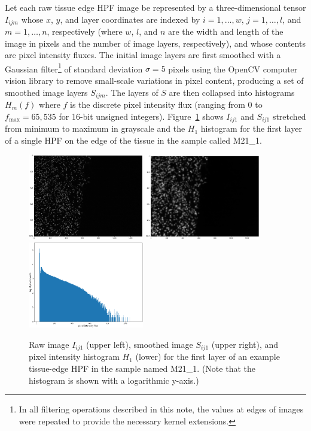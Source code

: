 \documentclass[letterpaper,11pt]{article}
\newcommand{\reffig}[1]{Figure~\ref{#1}}
\newcommand{\fmax}{f_{\mathrm{max}}}
\begin{document}
Let each raw tissue edge HPF image be represented by a three-dimensional tensor $I_{ijm}$ whose $x$, $y$, and layer coordinates are indexed by $i=1,\ldots,w$, $j=1,\ldots,l$, and $m=1,\ldots,n$, respectively (where $w$, $l$, and $n$ are the width and length of the image in pixels and the number of image layers, respectively), and whose contents are pixel intensity fluxes. The initial image layers are first smoothed with a Gaussian filter\footnote{In all filtering operations described in this note, the values at edges of images were repeated to provide the necessary kernel extensions.} of standard deviation $\sigma=5$ pixels using the OpenCV computer vision library \cite{opencv_library} to remove small-scale variations in pixel content, producing a set of smoothed image layers $S_{ijm}$. The layers of $S$ are then collapsed into histograms $H_{m}(f)$ where $f$ is the discrete pixel intensity flux (ranging from 0 to $\fmax=65,535$ for 16-bit unsigned integers). \reffig{fig:raw_to_smoothed_to_histogram} shows $I_{ij1}$ and $S_{ij1}$ stretched from minimum to maximum in grayscale and the $H_{1}$ histogram for the first layer of a single HPF on the edge of the tissue in the sample called M21\_1. 

\begin{figure}[!ht]
\centering
\includegraphics[width=0.45\textwidth]{images/masking/example_raw_image}
\includegraphics[width=0.45\textwidth]{images/masking/example_smoothed_image}
\includegraphics[width=0.45\textwidth]{images/masking/example_histogram}
\caption{\footnotesize Raw image $I_{ij1}$ (upper left), smoothed image $S_{ij1}$ (upper right), and pixel intensity histogram $H_{1}$ (lower) for the first layer of an example tissue-edge HPF in the sample named M21\_1. (Note that the histogram is shown with a logarithmic y-axis.)}
\label{fig:raw_to_smoothed_to_histogram}
\end{figure}
\end{document}

